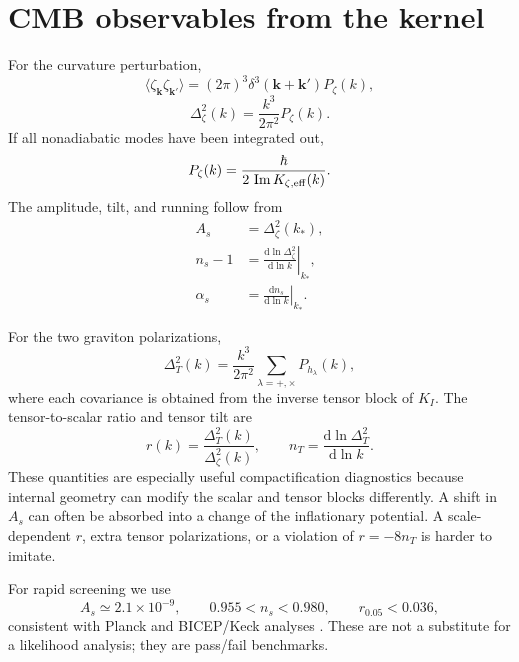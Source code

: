 \documentclass[aps,prd,twocolumn,superscriptaddress,nofootinbib,longbibliography,floatfix]{revtex4-2}
\newcommand{\dd}{\mathrm d}
\begin{document}
\section{CMB observables from the kernel}
\label{sec:observables}

For the curvature perturbation,
\begin{equation}
\langle\zeta_{\bm k}\zeta_{\bm k'}\rangle
=(2\pi)^3\delta^3(\bm k+\bm k')P_\zeta(k),
\end{equation}
\begin{equation}
\Delta_\zeta^2(k)=\frac{k^3}{2\pi^2}P_\zeta(k).
\end{equation}
If all nonadiabatic modes have been integrated out,
\begin{equation}
P_\zeta(k)=\frac{\hbar}{2\,\operatorname{Im}K_{\zeta,\rm eff}(k)}.
\label{eq:pzeta}
\end{equation}
The amplitude, tilt, and running follow from
\begin{align}
A_s&=\Delta_\zeta^2(k_*),\\
n_s-1&=\left.\frac{\dd\ln\Delta_\zeta^2}{\dd\ln k}\right|_{k_*},\\
\alpha_s&=\left.\frac{\dd n_s}{\dd\ln k}\right|_{k_*}.
\end{align}

For the two graviton polarizations,
\begin{equation}
\Delta_T^2(k)=\frac{k^3}{2\pi^2}\sum_{\lambda=+,\times}P_{h_\lambda}(k),
\end{equation}
where each covariance is obtained from the inverse tensor block of $K_I$. The tensor-to-scalar ratio and tensor tilt are
\begin{equation}
r(k)=\frac{\Delta_T^2(k)}{\Delta_\zeta^2(k)},\qquad
n_T=\frac{\dd\ln\Delta_T^2}{\dd\ln k}.
\end{equation}
These quantities are especially useful compactification diagnostics because internal geometry can modify the scalar and tensor blocks differently. A shift in $A_s$ can often be absorbed into a change of the inflationary potential. A scale-dependent $r$, extra tensor polarizations, or a violation of $r=-8n_T$ is harder to imitate.

For rapid screening we use
\begin{equation}
A_s\simeq2.1\times10^{-9},\qquad
0.955<n_s<0.980,\qquad r_{0.05}<0.036,
\label{eq:screen}
\end{equation}
consistent with Planck and BICEP/Keck analyses \cite{PlanckInflation2020,BICEPKeck2021,BICEPKeckReview2024}. These are not a substitute for a likelihood analysis; they are pass/fail benchmarks.
\end{document}
